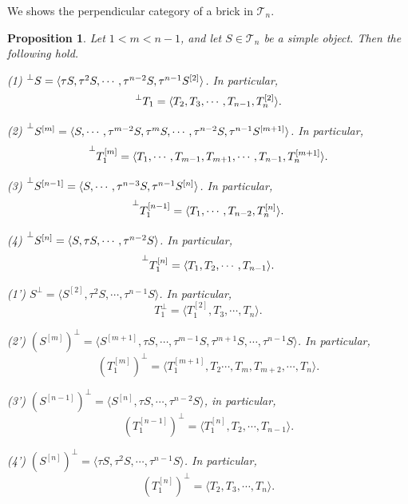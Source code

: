 \documentclass[a4paper, 11pt, reqno]{amsart}
\numberwithin{equation}{section}
\newtheorem{prop}[thm]{Proposition}
\theoremstyle{remark}
\theoremstyle{definition}
\begin{document}
We shows the perpendicular category of a brick in $\mathcal T_n$.

\begin{prop} \label{prop tube brick perpendicular}
   Let $1< m < n-1$, and let $S \in \mathcal T_n$ be a simple object. Then the following hold.

   (1) $\prescript{\perp}{}{S}=\langle \tau S, \tau^2 S, \cdots, \tau^{n-2} S, \tau^{n-1}S^{[2]} \rangle$. In particular, 
   \[
      \prescript{\perp}{}{T_1}=\langle T_2, T_3, \cdots, T_{n-1}, T_n^{[2]} \rangle.
   \]

   (2) $\prescript{\perp}{}{S^{[m]}}=\langle S, \cdots, \tau^{m-2}S,\tau^m S, \cdots, \tau ^{n-2} S, \tau ^{n-1} S^{[m+1]} \rangle$. In particular,
   \[
      \prescript{\perp}{}{T_1^{[m]}}=\langle T_1, \cdots, T_{m-1},T_{m+1}, \cdots, T_{n-1}, T_n^{[m+1]} \rangle.
   \]

   (3) $\prescript{\perp}{}{S^{[n-1]}}=\langle S, \cdots, \tau^{n-3}S, \tau ^{n-1} S^{[n]} \rangle$. In particular,
   \[
      \prescript{\perp}{}{T_1^{[n-1]}}=\langle T_1, \cdots, T_{n-2}, T_n^{[n]} \rangle.
   \]

   (4) $\prescript{\perp}{}{S^{[n]}}=\langle S, \tau S, \cdots , \tau^{n-2}S \rangle$. In particular, 
   \[
      \prescript{\perp}{}{T_1^{[n]}}=\langle T_1, T_2, \cdots, T_{n-1} \rangle.
   \]

   (1') $S^{\perp}=\langle S^{[2]}, \tau ^2 S, \cdots, \tau ^{n-1} S \rangle$. In particular, 
   \[
      T_1^{\perp}=\langle T_1^{[2]}, T_3, \cdots, T_{n} \rangle.
   \]

   (2') $(S^{[m]})^{\perp}=\langle S^{[m+1]}, \tau S, \cdots, \tau ^{m-1} S, \tau ^{m+1} S, \cdots, \tau ^{n-1} S\rangle$. In particular,
   \[
      (T_1^{[m]})^{\perp}=\langle T_1^{[m+1]},T_2 \cdots, T_{m},T_{m+2}, \cdots, T_{n} \rangle.
   \]

   (3') $(S^{[n-1]})^{\perp}=\langle S^{[n]}, \tau S, \cdots, \tau^{n-2} S \rangle$, in particular,
   \[
      (T_1^{[n-1]})^{\perp}=\langle T_1^{[n]}, T_2, \cdots, T_{n-1} \rangle.
   \]

   (4') $(S^{[n]})^{\perp}=\langle \tau S, \tau^2 S, \cdots , \tau^{n-1}S \rangle$. In particular, 
   \[
      (T_1^{[n]})^{\perp}=\langle T_2, T_3, \cdots, T_{n} \rangle.
   \]
\end{prop}
\end{document}
